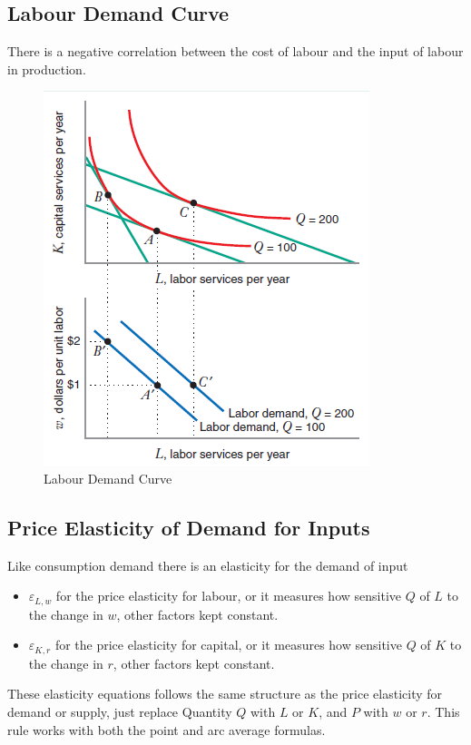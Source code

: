 \documentclass[../ECON-281-Notes.tex]{subfiles}
\begin{document}
\subsection{Labour Demand Curve}
There is a negative correlation between the cost of labour and the input of labour in production.

\begin{figure}[h]
    \centering
    \includegraphics[width=\columnwidth]{../assets/labour_demand_curve.png}   
    \caption{Labour Demand Curve}
    \label{fig:labour_demand_curve}
\end{figure}

\subsection{Price Elasticity of Demand for Inputs}
Like consumption demand there is an elasticity for the demand of input 
\begin{itemize}
    \item \(\varepsilon_{L,w}\) for the price elasticity for labour, or it measures how sensitive \(Q\) of \(L\) to the change in \(w\), other factors kept constant.
    \item \(\varepsilon_{K,r}\) for the price elasticity for capital, or it measures how sensitive \(Q\) of \(K\) to the change in \(r\), other factors kept constant.
\end{itemize}
These elasticity equations follows the same structure as the price elasticity for demand or supply, just replace Quantity \(Q\) with \(L\) or \(K\), and \(P\) with \(w\) or \(r\). This rule works with both the point and arc average formulas. 
\end{document}
